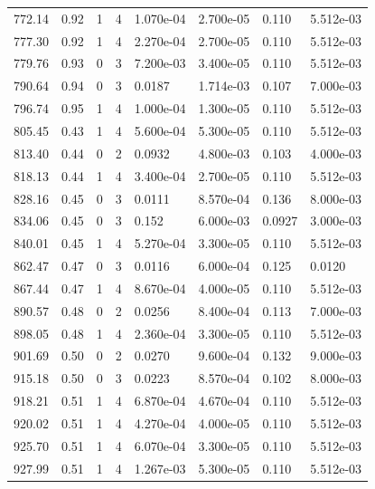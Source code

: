 \documentclass[preview]{standalone}
\begin{document}
{{{{\begin{tabular}{L{1.2cm}C{1.2cm} C{0.3cm}C{0.5cm} C{1.4cm}C{1.4cm} C{1.4cm}C{1.4cm}}
  772.14  &  0.92  & 1     &  4 &  1.070e-04  & 2.700e-05  & 0.110 &  5.512e-03   \\ 
  777.30  &  0.92  & 1     &  4 &  2.270e-04  & 2.700e-05  & 0.110 &  5.512e-03   \\ 
  779.76  &  0.93  & 0     &  3 &  7.200e-03  & 3.400e-05  & 0.110 &  5.512e-03   \\ 
  790.64  &  0.94  & 0     &  3 &  0.0187  & 1.714e-03  & 0.107 &  7.000e-03   \\ 
  796.74  &  0.95  & 1     &  4 &  1.000e-04  & 1.300e-05  & 0.110 &  5.512e-03   \\ 
  805.45  &  0.43  & 1     &  4 &  5.600e-04  & 5.300e-05  & 0.110 &  5.512e-03   \\ 
  813.40  &  0.44  & 0     &  2 &  0.0932  & 4.800e-03  & 0.103 &  4.000e-03   \\ 
  818.13  &  0.44  & 1     &  4 &  3.400e-04  & 2.700e-05  & 0.110 &  5.512e-03   \\ 
  828.16  &  0.45  & 0     &  3 &  0.0111  & 8.570e-04  & 0.136 &  8.000e-03   \\ 
  834.06  &  0.45  & 0     &  3 &  0.152  & 6.000e-03  & 0.0927 &  3.000e-03   \\ 
  840.01  &  0.45  & 1     &  4 &  5.270e-04  & 3.300e-05  & 0.110 &  5.512e-03   \\ 
  862.47  &  0.47  & 0     &  3 &  0.0116  & 6.000e-04  & 0.125 &  0.0120   \\ 
  867.44  &  0.47  & 1     &  4 &  8.670e-04  & 4.000e-05  & 0.110 &  5.512e-03   \\ 
  890.57  &  0.48  & 0     &  2 &  0.0256  & 8.400e-04  & 0.113 &  7.000e-03   \\ 
  898.05  &  0.48  & 1     &  4 &  2.360e-04  & 3.300e-05  & 0.110 &  5.512e-03   \\ 
  901.69  &  0.50  & 0     &  2 &  0.0270  & 9.600e-04  & 0.132 &  9.000e-03   \\ 
  915.18  &  0.50  & 0     &  3 &  0.0223  & 8.570e-04  & 0.102 &  8.000e-03   \\ 
  918.21  &  0.51  & 1     &  4 &  6.870e-04  & 4.670e-04  & 0.110 &  5.512e-03   \\ 
  920.02  &  0.51  & 1     &  4 &  4.270e-04  & 4.000e-05  & 0.110 &  5.512e-03   \\ 
  925.70  &  0.51  & 1     &  4 &  6.070e-04  & 3.300e-05  & 0.110 &  5.512e-03   \\ 
  927.99  &  0.51  & 1     &  4 &  1.267e-03  & 5.300e-05  & 0.110 &  5.512e-03   \\ 

\end{tabular}}}}}
\end{document}
